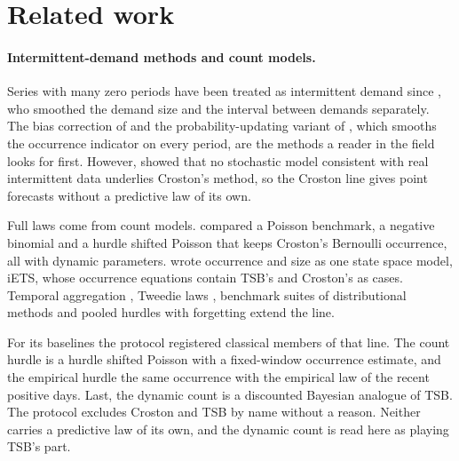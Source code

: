 \providecommand{\qs}{QScore9}

\section{Related work}
\label{sec:related}

\paragraph{Intermittent-demand methods and count models.} Series with many zero periods have been treated as
intermittent demand since \citet{croston1972}, who smoothed the demand size and the interval between demands
separately. The bias correction of \citet{syntetos2005} and the probability-updating variant of
\citet{teunter2011}, which smooths the occurrence indicator on every period, are the methods a reader in the
field looks for first. However, \citet{shenstone2005} showed that no stochastic model consistent with real
intermittent data underlies Croston's method, so the Croston line gives point forecasts without a predictive
law of its own.

Full laws come from count models. \citet{snyder2012} compared a Poisson benchmark, a negative binomial and a
hurdle shifted Poisson that keeps Croston's Bernoulli occurrence, all with dynamic parameters.
\citet{svetunkov2023} wrote occurrence and size as one state space model, iETS, whose occurrence equations
contain TSB's and Croston's as cases. Temporal aggregation \citep{nikolopoulos2011}, Tweedie laws
\citep{damato2025}, benchmark suites of distributional methods \citep{damato2026} and pooled hurdles with
forgetting \citep{bai2026} extend the line.

For its baselines the protocol registered classical members of that line. The count hurdle is a hurdle shifted
Poisson with a fixed-window occurrence estimate, and the empirical hurdle the same occurrence with the
empirical law of the recent positive days. Last, the dynamic count is a discounted Bayesian analogue of TSB.
The protocol excludes Croston and TSB by name without a reason. Neither carries a predictive law of its own,
and the dynamic count is read here as playing TSB's part.

